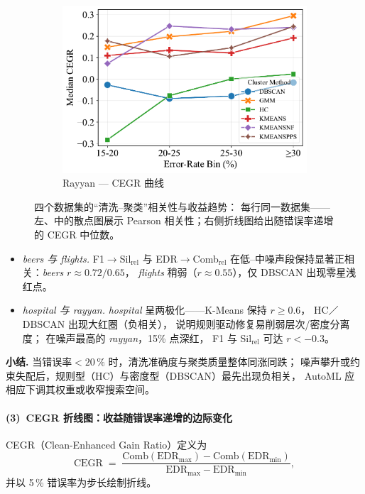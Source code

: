 \documentclass[10pt]{article} %
\numberwithin{equation}{section}
\begin{document}
\begin{figure}[htbp]
\begin{subfigure}[b]{0.33\linewidth}
    \includegraphics[width=\linewidth]{figures/6.4.3graph/CEGR_5pct_rayyan.pdf}
    \caption{Rayyan — CEGR 曲线}
    \label{fig:ra_cegr}
  \end{subfigure}

  \caption{四个数据集的“清洗–聚类”相关性与收益趋势：  
           每行同一数据集——左、中的散点图展示 Pearson 相关性；右侧折线图给出随错误率递增的 CEGR 中位数。}
  \label{fig:scatter_line_grid}
\end{figure}

\begin{itemize}[leftmargin=1.6em,topsep=2pt,itemsep=2pt]
  \item \emph{beers 与 flights.}  
        F1\(\!\rightarrow\!\)Sil\(_{\text{rel}}\) 与 EDR\(\!\rightarrow\!\)Comb\(_{\text{rel}}\)  
        在低–中噪声段保持显著正相关：\emph{beers} \(r\approx0.72/0.65\)，%
        \emph{flights} 稍弱（\(r\approx0.55\)），仅 DBSCAN 出现零星浅红点。  

  \item \emph{hospital 与 rayyan.}  
        \emph{hospital} 呈两极化——K-Means 保持 \(r\ge0.6\)，%
        HC／DBSCAN 出现大红圈（负相关），%
        说明规则驱动修复易削弱层次/密度分离度；  
        在噪声最高的 \emph{rayyan}，15\% 点深红，%
        F1 与 Sil\(_{\text{rel}}\) 可达 \(r<-0.3\)。  
\end{itemize}

\noindent\textbf{小结.}  
当错误率\(<20\,\%\) 时，清洗准确度与聚类质量整体同涨同跌；%
噪声攀升或约束失配后，规则型（HC）与密度型（DBSCAN）最先出现负相关，%
AutoML 应相应下调其权重或收窄搜索空间。

\paragraph{(3)~CEGR 折线图：收益随错误率递增的边际变化}\par
CEGR（Clean-Enhanced Gain Ratio）定义为
\begin{equation}
  \mathrm{CEGR}
  \;=\;
  \frac{\text{Comb}(\mathrm{EDR}_{\max})-\text{Comb}(\mathrm{EDR}_{\min})}
       {\mathrm{EDR}_{\max}-\mathrm{EDR}_{\min}},
  \label{eq:cegr-def}
\end{equation}
并以 5\,\% 错误率为步长绘制折线。
\end{document}
